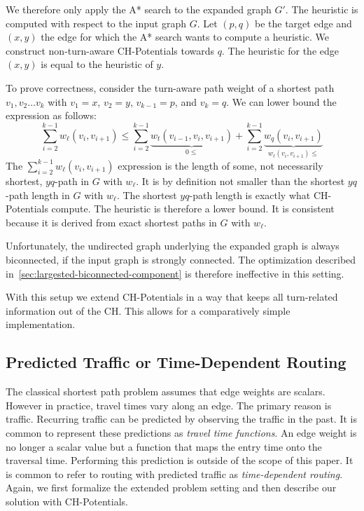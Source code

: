 \documentclass[letterpaper]{article} %
\begin{document}
We therefore only apply the A* search to the expanded graph $G'$.
The heuristic is computed with respect to the input graph $G$.
Let $(p,q)$ be the target edge and $(x,y)$ the edge for which the A* search wants to compute a heuristic.
We construct non-turn-aware CH-Potentials towards $q$.
The heuristic for the edge $(x,y)$ is equal to the heuristic of $y$.

To prove correctness, consider the turn-aware path weight of a shortest path $v_1,v_2\ldots v_k$ with $v_1=x$, $v_2=y$, $v_{k-1}=p$, and $v_k=q$.
We can lower bound the expression as follows:
\[
\sum_{i=2}^{k-1} w_\ell(v_i,v_{i+1}) \le \sum_{i=2}^{k-1} \underbrace{w_t(v_{i-1},v_i,v_{i+1})}_{0\le} + \sum_{i=2}^{k-1} \underbrace{w_q(v_i,v_{i+1})}_{w_\ell(v_i,v_{i+1})\le}
\]
The $\sum_{i=2}^{k-1} w_\ell(v_i,v_{i+1})$ expression is the length of some, not necessarily shortest, $yq$-path in $G$ with $w_\ell$.
It is by definition not smaller than the shortest $yq$-path length in $G$ with $w_\ell$.
The shortest $yq$-path length is exactly what CH-Potentials compute.
The heuristic is therefore a lower bound.
It is consistent because it is derived from exact shortest paths in $G$ with $w_\ell$.

Unfortunately, the undirected graph underlying the expanded graph is always biconnected, if the input graph is strongly connected.
The optimization described in~\ref{sec:largested-biconnected-component} is therefore ineffective in this setting.

With this setup we extend CH-Potentials in a way that keeps all turn-related information out of the CH.
This allows for a comparatively simple implementation.

\subsection{Predicted Traffic or Time-Dependent Routing}
\label{sec:predicted-traffic}

The classical shortest path problem assumes that edge weights are scalars.
However in practice, travel times vary along an edge.
The primary reason is traffic.
Recurring traffic can be predicted by observing the traffic in the past.
It is common \cite{bgsv-mtdtt-13,bdpw-dtdrp-16,swz-sfert-19} to represent these predictions as \emph{travel time functions}.
An edge weight is no longer a scalar value but a function that maps the entry time onto the traversal time.
Performing this prediction is outside of the scope of this paper.
It is common to refer to routing with predicted traffic as \emph{time-dependent routing}.
Again, we first formalize the extended problem setting and then describe our solution with CH-Potentials.
\end{document}
